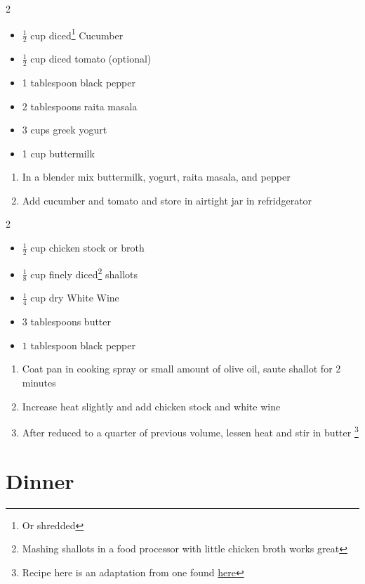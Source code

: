 \documentclass[oneside]{recipe}
\newcommand{\recipecolumn}[2]{
	\begin{multicols}{2}
	\raggedcolumns
	#1
	\columnbreak
	#2
	\end{multicols}
}
\begin{document}
\recipecolumn{
	\begin{itemize}	
		\item $\frac{1}{2}$ cup diced\footnote{Or shredded} Cucumber
		\item $\frac{1}{2}$ cup diced tomato (optional)
		\item 1 tablespoon black pepper
		\item 2 tablespoons raita masala
		\item 3 cups greek yogurt
		\item 1 cup buttermilk
	\end{itemize}
}{
	\begin{enumerate}
		\item In a blender mix buttermilk, yogurt, raita masala, and pepper
		\item Add cucumber and tomato and store in airtight jar in refridgerator
	\end{enumerate}
}

\recipecolumn{
	\begin{itemize}
		\item $\frac{1}{2}$ cup chicken stock or broth
		\item $\frac{1}{8}$ cup finely diced\footnote{Mashing shallots in a food processor with little chicken broth works great} shallots
		\item $\frac{1}{4}$ cup dry White Wine
		\item $3$ tablespoons butter
		\item $1$ tablespoon black pepper
	\end{itemize}
}{
	\begin{enumerate}
		\item Coat pan in cooking spray or small amount of olive oil, saute shallot for 2 minutes
		\item Increase heat slightly and add chicken stock and white wine
		\item After reduced to a quarter of previous volume, lessen heat and stir in butter \footnote{Recipe here is an adaptation from one found \href{http://www.myrecipes.com/recipe/white-wine-sauce}{here}}
	\end{enumerate}
}

\chapter{Dinner}
\end{document}
